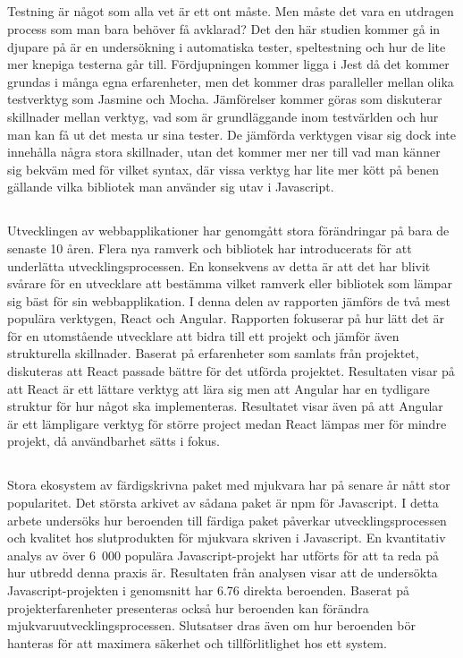 \subsection*{}
Testning är något som alla vet är ett ont måste. Men måste det vara en utdragen process som man bara behöver få avklarad? Det den här studien kommer gå in djupare på är en undersökning i automatiska tester, speltestning och hur de lite mer knepiga testerna går till. Fördjupningen kommer ligga i Jest då det kommer grundas i många egna erfarenheter, men det kommer dras paralleller mellan olika testverktyg som Jasmine och Mocha. Jämförelser kommer göras som diskuterar skillnader mellan verktyg, vad som är grundläggande inom testvärlden och hur man kan få ut det mesta ur sina tester. De jämförda verktygen visar sig dock inte innehålla några stora skillnader, utan det kommer mer ner till vad man känner sig bekväm med för vilket syntax, där vissa verktyg har lite mer kött på benen gällande vilka bibliotek man använder sig utav i Javascript.

\subsection*{}
Utvecklingen av webbapplikationer har genomgått stora förändringar på bara de senaste 10 åren. Flera nya ramverk och bibliotek har introducerats för att underlätta utvecklingsprocessen. En konsekvens av detta är att det har blivit svårare för en utvecklare att bestämma vilket ramverk eller bibliotek som lämpar sig bäst för sin webbapplikation. I denna delen av rapporten jämförs de två mest populära verktygen, React och Angular. Rapporten fokuserar på hur lätt det är för en utomstående utvecklare att bidra till ett projekt och jämför även strukturella skillnader. Baserat på erfarenheter som samlats från projektet, diskuteras att React passade bättre för det utförda projektet. Resultaten visar på att React är ett lättare verktyg att lära sig men att Angular har en tydligare struktur för hur något ska implementeras. Resultatet visar även på att Angular är ett lämpligare verktyg för större project medan React lämpas mer för mindre projekt, då användbarhet sätts i fokus.

\subsection*{}
Stora ekosystem av färdigskrivna paket med mjukvara har på senare år nått stor popularitet. Det största arkivet av sådana paket är npm för Javascript. I detta arbete undersöks hur beroenden till färdiga paket påverkar utvecklingsprocessen och kvalitet hos slutprodukten för mjukvara skriven i Javascript. En kvantitativ analys av över 6~000 populära Javascript-projekt har utförts för att ta reda på hur utbredd denna praxis är. Resultaten från analysen visar att de undersökta Javascript-projekten i genomsnitt har 6.76 direkta beroenden. Baserat på projekterfarenheter presenteras också hur beroenden kan förändra mjukvaruutvecklingsprocessen. Slutsatser dras även om hur beroenden bör hanteras för att maximera säkerhet och tillförlitlighet hos ett system.

